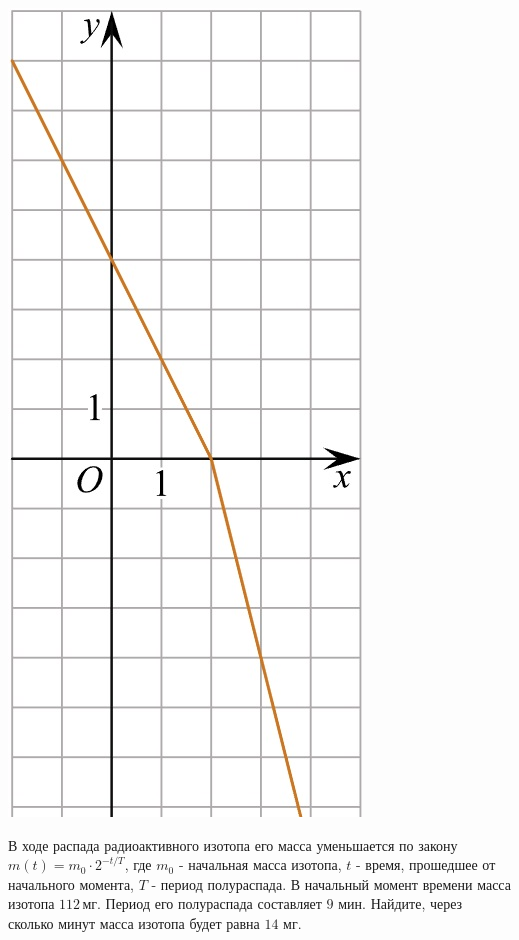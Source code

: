 \begin{homework}[number=2]
\begin{listofex}
\begin{minipage}[c]{0.1\textwidth}
			\includegraphics[align=t, width=\textwidth]{../pics/G101M4H2-7.jpg}
		\end{minipage}
		\item В ходе распада радиоактивного изотопа его масса уменьшается по закону \( m(t)=m_0\cdot2^{-t/T} \), где \( m_0 \) - начальная масса изотопа,  \( t \) - время, прошедшее от начального момента, \( T \) - период полураспада. В начальный момент времени масса изотопа \( 112 \) мг. Период его полураспада составляет \( 9  \) мин. Найдите, через сколько минут масса изотопа будет равна \( 14  \) мг.
		\item {}
	\end{listofex}
	\newpage
\end{homework}
